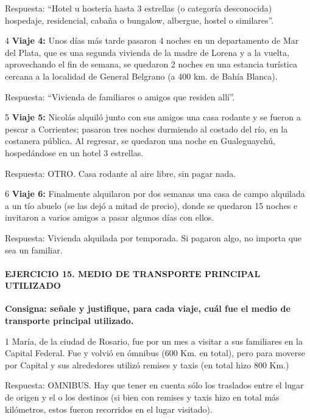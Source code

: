 \documentclass[
  openany]{book}
\begin{document}
Respuesta: ``Hotel u hostería hasta 3 estrellas (o categoría desconocida) hospedaje, residencial, cabaña o bungalow, albergue, hostel o similares''.

4 \textbf{Viaje 4:} Unos días más tarde pasaron 4 noches en un departamento de Mar del Plata, que es una segunda vivienda de la madre de Lorena y a la vuelta, aprovechando el fin de semana, se quedaron 2 noches en una estancia turística cercana a la localidad de General Belgrano (a 400 km. de Bahía Blanca).

Respuesta: ``Vivienda de familiares o amigos que residen allí''.

5 \textbf{Viaje 5:} Nicolás alquiló junto con sus amigos una casa rodante y se fueron a pescar a Corrientes; pasaron tres noches durmiendo al costado del río, en la costanera pública. Al regresar, se quedaron una noche en Gualeguaychú, hospedándose en un hotel 3 estrellas.

Respuesta: OTRO. Casa rodante al aire libre, sin pagar nada.

6 \textbf{Viaje 6:} Finalmente alquilaron por dos semanas una casa de campo alquilada a un tío abuelo (se las dejó a mitad de precio), donde se quedaron 15 noches e invitaron a varios amigos a pasar algunos días con ellos.

Respuesta: Vivienda alquilada por temporada. Si pagaron algo, no importa que sea un familiar.

\hypertarget{ejercicio-15.-medio-de-transporte-principal-utilizado-1}{%
\paragraph{\texorpdfstring{\textbf{EJERCICIO 15. MEDIO DE TRANSPORTE PRINCIPAL UTILIZADO}}{EJERCICIO 15. MEDIO DE TRANSPORTE PRINCIPAL UTILIZADO}}\label{ejercicio-15.-medio-de-transporte-principal-utilizado-1}}

\textbf{Consigna: señale y justifique, para cada viaje, cuál fue el medio de transporte principal utilizado.}

1 María, de la ciudad de Rosario, fue por un mes a visitar a sus familiares en la Capital Federal. Fue y volvió en ómnibus (600 Km. en total), pero para moverse por Capital y sus alrededores utilizó remises y taxis (en total hizo 800 Km.)

Respuesta: OMNIBUS. Hay que tener en cuenta sólo los traslados entre el lugar de origen y el o los destinos (si bien con remises y taxis hizo en total más kilómetros, estos fueron recorridos en el lugar visitado).
\end{document}
